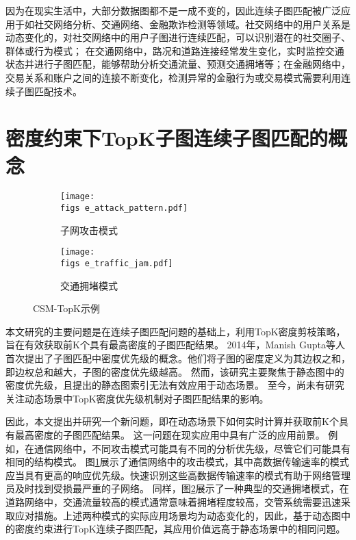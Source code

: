 因为在现实生活中，大部分数据图都不是一成不变的，因此连续子图匹配被广泛应用于如社交网络分析、交通网络、金融欺诈检测等领域。社交网络中的用户关系是动态变化的，对社交网络中的用户子图进行连续匹配，可以识别潜在的社交圈子、群体或行为模式；
在交通网络中，路况和道路连接经常发生变化，实时监控交通状态并进行子图匹配，能够帮助分析交通流量、预测交通拥堵等；在金融网络中，交易关系和账户之间的连接不断变化，检测异常的金融行为或交易模式需要利用连续子图匹配技术。


\section{密度约束下TopK子图连续子图匹配的概念}
\begin{figure}[h!]
    \def\wscorevone{0.49}
    \centering
        \begin{subfigure}[t]{\wscorevone\linewidth}
            \centering
            \resizebox{\linewidth}{!}
            {
                \texttt{[image: \\figs e\_attack\_pattern.pdf]}
            }
            \caption{子网攻击模式~\cite{static-topk-Gupta-DBLP:conf/icde/GuptaGYCH14}}
            \label{fig:example_attack_pattern}
        \end{subfigure}
        \hfill
        \begin{subfigure}[t]{\wscorevone\linewidth}
            \centering
            \resizebox{\linewidth}{!}
            {
                \texttt{[image: \\figs e\_traffic\_jam.pdf]}
            }
            \caption{交通拥堵模式~\cite{traffic-graph-matching-DBLP:journals/pvldb/SongGCW14}}
            \label{fig:example_traffic_jam}
        \end{subfigure}
        \label{fig:definition}
        \caption{CSM-TopK示例}
    \end{figure}
本文研究的主要问题是在连续子图匹配问题的基础上，利用TopK密度剪枝策略，旨在有效获取前K个具有最高密度的子图匹配结果。
2014年，Manish Gupta等人首次提出了子图匹配中密度优先级的概念\cite{static-topk-Gupta-DBLP:conf/icde/GuptaGYCH14}。他们将子图的密度定义为其边权之和，即边权总和越大，子图的密度优先级越高。
然而，该研究主要聚焦于静态图中的密度优先级，且提出的静态图索引无法有效应用于动态场景。
至今，尚未有研究关注动态场景中TopK密度优先级机制对子图匹配结果的影响。

因此，本文提出并研究一个新问题，即在动态场景下如何实时计算并获取前K个具有最高密度的子图匹配结果。
这一问题在现实应用中具有广泛的应用前景。
例如，在通信网络中，不同攻击模式可能具有不同的分析优先级，尽管它们可能具有相同的结构模式。
图\ref{fig:example_attack_pattern}展示了通信网络中的攻击模式\cite{static-topk-Gupta-DBLP:conf/icde/GuptaGYCH14}，其中高数据传输速率的模式应当具有更高的响应优先级。快速识别这些高数据传输速率的模式有助于网络管理员及时找到受损最严重的子网络。
同样，图\ref{fig:example_traffic_jam}展示了一种典型的交通拥堵模式\cite{traffic-graph-matching-DBLP:journals/pvldb/SongGCW14}，在道路网络中，交通流量较高的模式通常意味着拥堵程度较高，交管系统需要迅速采取应对措施。上述两种模式的实际应用场景均为动态变化的，因此，基于动态图中的密度约束进行TopK连续子图匹配，其应用价值远高于静态场景中的相同问题。

